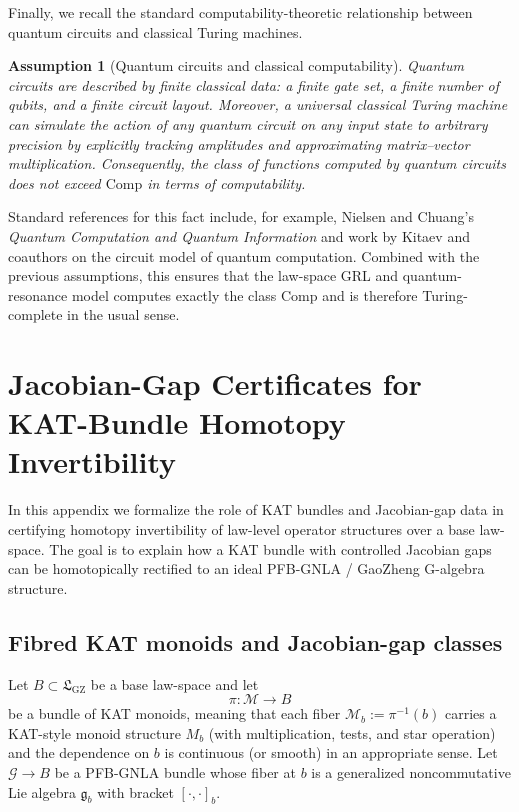 \documentclass[11pt]{book}
\newcommand{\GZLS}{\ensuremath{\mathfrak{L}_{\mathrm{GZ}}}}
\theoremstyle{plain}
\newtheorem{assumption}[theorem]{Assumption}
\theoremstyle{definition}
\theoremstyle{remark}
\begin{document}
Finally, we recall the standard computability-theoretic relationship
between quantum circuits and classical Turing machines.

\begin{assumption}[Quantum circuits and classical computability]
Quantum circuits are described by finite classical data: a finite
gate set, a finite number of qubits, and a finite circuit layout.
Moreover, a universal classical Turing machine can simulate the
action of any quantum circuit on any input state to arbitrary
precision by explicitly tracking amplitudes and approximating
matrix--vector multiplication. Consequently, the class of functions
computed by quantum circuits does not exceed $\mathrm{Comp}$ in terms
of computability.
\end{assumption}

Standard references for this fact include, for example, Nielsen and
Chuang's \emph{Quantum Computation and Quantum Information} and work
by Kitaev and coauthors on the circuit model of quantum computation.
Combined with the previous assumptions, this ensures that the
law-space GRL and quantum-resonance model computes exactly the class
$\mathrm{Comp}$ and is therefore Turing-complete in the usual sense.

\chapter{Jacobian-Gap Certificates for KAT-Bundle Homotopy Invertibility}

In this appendix we formalize the role of KAT bundles and Jacobian-gap
data in certifying homotopy invertibility of law-level operator
structures over a base law-space. The goal is to explain how a KAT
bundle with controlled Jacobian gaps can be homotopically rectified to
an ideal PFB-GNLA / GaoZheng G-algebra structure.

\section{Fibred KAT monoids and Jacobian-gap classes}

Let $B\subset\GZLS$ be a base law-space and let
\[
  \pi:\mathcal{M}\to B
\]
be a bundle of KAT monoids, meaning that each fiber
$\mathcal{M}_b := \pi^{-1}(b)$ carries a KAT-style monoid structure
$M_b$ (with multiplication, tests, and star operation) and the
dependence on $b$ is continuous (or smooth) in an appropriate sense.
Let $\mathcal{G}\to B$ be a PFB-GNLA bundle whose fiber at $b$ is a
generalized noncommutative Lie algebra $\mathfrak{g}_b$ with bracket
$[\cdot,\cdot]_b$.
\end{document}
